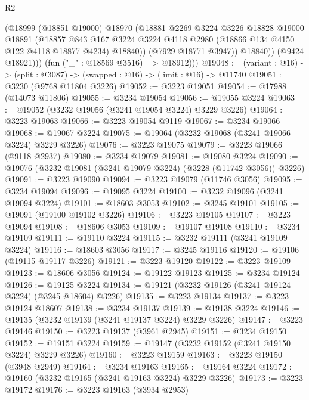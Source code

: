 \begin{lexlean}{R2}
\begin{coremodule}
                (@18999
                  (@18851 @19000)
                  @18970
                  (@18881
                    @2269
                    @3224
                    @3226
                    @18828
                    @19000
                    @18891
                    (@18857
                      @843
                      @167
                      @3224
                      @3224
                      @4118
                      @2980
                      (@18866 @134 @4150 @122 @4118 @18877 @4234)
                      @18840))
                  (@7929 @18771 @3947))
                @18840))
            (@9424 @18921)))
        (fun ("_" : @18569 @3516) => @18912)))
@19048 := (variant : @16) -> (split : @3087) -> (swapped : @16) -> (limit : @16) -> @11740
@19051 := @3230 (@9768 @11804 @3226)
@19052 := @3223 @19051
@19054 := @17988 (@14073 @11806)
@19055 := @3234 @19054
@19056 := @19055 @3224
@19063 := @19052 (@3232 @19056 (@3241 @19054 @3224) @3229 @3226)
@19064 := @3223 @19063
@19066 := @3223 @19054 @9119
@19067 := @3234 @19066
@19068 := @19067 @3224
@19075 := @19064 (@3232 @19068 (@3241 @19066 @3224) @3229 @3226)
@19076 := @3223 @19075
@19079 := @3223 @19066 (@9118 @2937)
@19080 := @3234 @19079
@19081 := @19080 @3224
@19090 := @19076 (@3232 @19081 (@3241 @19079 @3224) (@3228 (@11742 @3056)) @3226)
@19091 := @3223 @19090
@19094 := @3223 @19079 (@11746 @3056)
@19095 := @3234 @19094
@19096 := @19095 @3224
@19100 := @3232 @19096 (@3241 @19094 @3224)
@19101 := @18603 @3053
@19102 := @3245 @19101
@19105 := @19091 (@19100 @19102 @3226)
@19106 := @3223 @19105
@19107 := @3223 @19094
@19108 := @18606 @3053
@19109 := @19107 @19108
@19110 := @3234 @19109
@19111 := @19110 @3224
@19115 := @3232 @19111 (@3241 @19109 @3224)
@19116 := @18603 @3056
@19117 := @3245 @19116
@19120 := @19106 (@19115 @19117 @3226)
@19121 := @3223 @19120
@19122 := @3223 @19109
@19123 := @18606 @3056
@19124 := @19122 @19123
@19125 := @3234 @19124
@19126 := @19125 @3224
@19134 := @19121 (@3232 @19126 (@3241 @19124 @3224) (@3245 @18604) @3226)
@19135 := @3223 @19134
@19137 := @3223 @19124 @18607
@19138 := @3234 @19137
@19139 := @19138 @3224
@19146 := @19135 (@3232 @19139 (@3241 @19137 @3224) @3229 @3226)
@19147 := @3223 @19146
@19150 := @3223 @19137 (@3961 @2945)
@19151 := @3234 @19150
@19152 := @19151 @3224
@19159 := @19147 (@3232 @19152 (@3241 @19150 @3224) @3229 @3226)
@19160 := @3223 @19159
@19163 := @3223 @19150 (@3948 @2949)
@19164 := @3234 @19163
@19165 := @19164 @3224
@19172 := @19160 (@3232 @19165 (@3241 @19163 @3224) @3229 @3226)
@19173 := @3223 @19172
@19176 := @3223 @19163 (@3934 @2953)

\end{coremodule}
\end{lexlean}
